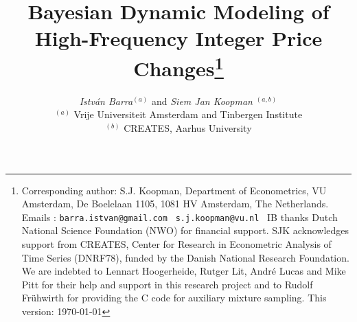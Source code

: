 \documentclass[12pt]{article}
\begin{document}
\title{\Huge{Bayesian Dynamic Modeling of \\ High-Frequency Integer Price Changes}\footnote{Corresponding author:
S.J. Koopman, Department of Econometrics, VU Amsterdam, De Boelelaan 1105, 1081 HV Amsterdam,
The Netherlands. Emails : \texttt{barra.istvan@gmail.com} \ \texttt{s.j.koopman@vu.nl} \
IB thanks Dutch National Science Foundation (NWO) for financial support.
SJK acknowledges support from CREATES, Center for Research in Econometric Analysis of Time Series (DNRF78), funded by the Danish National Research Foundation.
We are indebted to Lennart Hoogerheide, Rutger Lit, Andr\'e Lucas and Mike Pitt for
their help and support in this research project and to Rudolf Fr\"{u}hwirth for providing the C code for auxiliary mixture sampling. This version: \today} 
}



\author{\textit{Istv\'an Barra}$^{(a)}$ and \textit{Siem Jan Koopman} $^{(a,b)}$
\\
$^{(a)}$ \small Vrije Universiteit Amsterdam and Tinbergen Institute\\
$^{(b)}$ \small CREATES, Aarhus University \\
\date{ }
}

\maketitle
\end{document}
